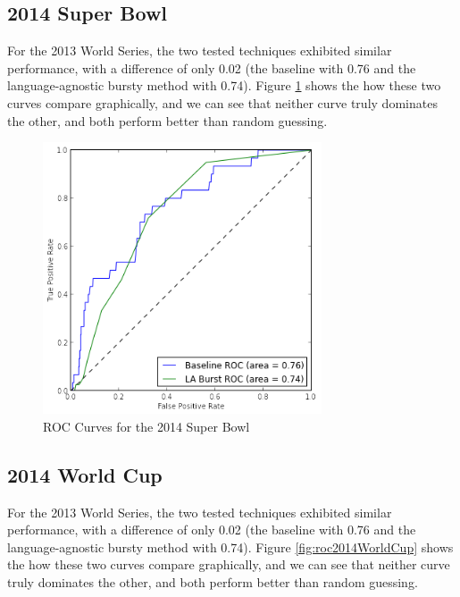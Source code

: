 \documentclass{acm_proc_article-sp}
\begin{document}
\subsection{2014 Super Bowl}

For the 2013 World Series, the two tested techniques exhibited similar performance, with a difference of only 0.02 (the baseline with 0.76 and the language-agnostic bursty method with 0.74).
Figure \ref{fig:roc2014SuperBowl} shows the how these two curves compare graphically, and we can see that neither curve truly dominates the other, and both perform better than random guessing.

\begin{figure}[hbtp]
\begin{center}
\includegraphics[width=3.25in]{./figures/roc_2013_WorldSeries.png}
\caption{ROC Curves for the 2014 Super Bowl}
\label{fig:roc2014SuperBowl}
\end{center}
\end{figure}

\subsection{2014 World Cup}

For the 2013 World Series, the two tested techniques exhibited similar performance, with a difference of only 0.02 (the baseline with 0.76 and the language-agnostic bursty method with 0.74).
Figure \ref{fig:roc2014WorldCup} shows the how these two curves compare graphically, and we can see that neither curve truly dominates the other, and both perform better than random guessing.
\end{document}
